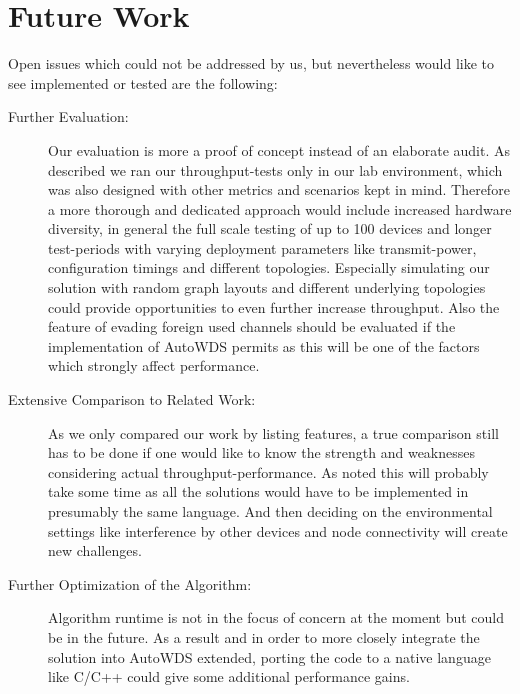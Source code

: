   \section{Future Work}
    Open issues which could not be addressed by us, but nevertheless would like 
    to see implemented or tested are the following:
    \begin{description}
      \item [Further Evaluation:]
	Our evaluation is more a proof of concept instead of an elaborate audit. As described we ran our throughput-tests only in our lab environment, 
	which was also designed with other metrics and scenarios kept in mind. Therefore a more thorough and dedicated approach would include increased hardware diversity, 
	in general the full scale testing of up to 100 devices and longer test-periods with varying deployment parameters like transmit-power, 
	configuration timings and different topologies.
	Especially simulating our solution with random graph layouts and different underlying topologies could provide opportunities to even further increase throughput.
	Also the feature of evading foreign used channels should be evaluated if the implementation of 
	AutoWDS permits as this will be one of the factors which strongly affect performance.
      
      \item[Extensive Comparison to Related Work:]
	As we only compared our work by listing features, a true comparison still has to be done if one would 
	like to know the strength and weaknesses considering actual throughput-performance.
	As noted this will probably take some time as all the solutions would have to be 
	implemented in presumably the same language. And then deciding on the environmental settings
	like interference by other devices and node connectivity will create new challenges.
      
      \item[Further Optimization of the Algorithm:]
	Algorithm runtime is not in the focus of concern at the moment but could be in the future. 
	As a result and in order to more closely integrate the solution into AutoWDS extended,
	porting the code to a native language like C/C++ could give some additional performance gains.
      

\end{description}
